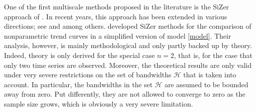\documentclass[a4paper,12pt]{article}
\begin{document}


One of the first multiscale methods proposed in the literature is the SiZer approach of \cite{ChaudhuriMarron1999, ChaudhuriMarron2000}. In recent years, this approach has been extended in various directions; see \cite{Park2004} and \cite{HannigMarron2006} among others. \cite{Park2009} developed SiZer methods for the comparison of nonparametric trend curves in a simplified version of model \eqref{model}. Their analysis, however, is mainly methodological and only partly backed up by theory. Indeed, theory is only derived for the special case $n=2$, that is, for the case that only two time series are observed. Moreover, the theoretical results are only valid under very severe restrictions on the set of bandwidths $\mathcal{H}$ that is taken into account. In particular, the bandwidths in the set $\mathcal{H}$ are assumed to be bounded away from zero. Put differently, they are not allowed to converge to zero as the sample size grows, which is obviously a very severe limitation. 
\end{document}
